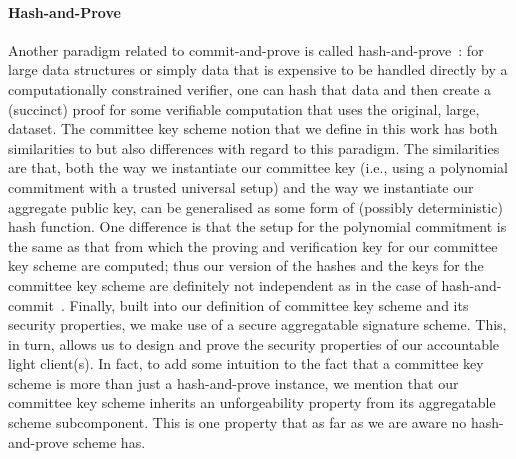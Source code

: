 \paragraph{Hash-and-Prove} Another paradigm related to commit-and-prove is called hash-and-prove~\cite{HP_paper}: for large data structures or simply data that is 
expensive to be handled directly by a computationally constrained verifier, one can hash that data and then create a (succinct) proof for some 
verifiable computation that uses the original, large, dataset. The committee key scheme notion that we define in this work has both similarities 
to but also differences with regard to this paradigm. The similarities are that, both the way we instantiate our committee key (i.e., using a polynomial 
commitment with a trusted universal setup) and the way we instantiate our aggregate public key, can be generalised as some form of (possibly deterministic) 
hash function. One difference is that the setup for the polynomial commitment is the same as that from which the proving and verification key for our committee key scheme are 
computed; thus our version of the hashes and the keys for the committee key scheme are definitely not independent as in the case of hash-and-commit~\cite{HP_paper}. Finally, 
built into our definition of committee key scheme and its security properties, we make use of a secure aggregatable signature scheme. This, in turn, allows us to design and 
prove the security properties of our accountable light client(s). In fact, to add some intuition to the fact that a committee key scheme is more than 
just a hash-and-prove instance, we mention that our committee key scheme inherits an unforgeability property from its aggregatable scheme subcomponent. 
This is one property that as far as we are aware no hash-and-prove scheme has. \\
\vspace{-0.2cm}
